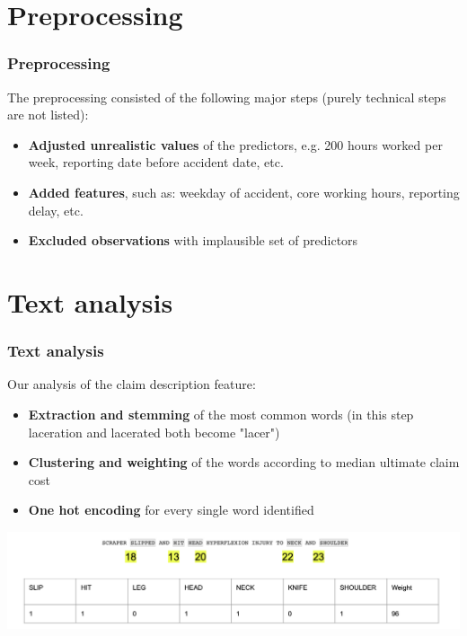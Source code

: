 \documentclass{beamer}
\begin{document}

\section{Preprocessing}
\begin{frame}
\frametitle{Preprocessing}
The preprocessing consisted of the following major steps (purely technical steps are not listed):
\begin{itemize}
\item \textbf{Adjusted unrealistic values} of the predictors, e.g. 200 hours worked per week, reporting date before accident date, etc.
\item \textbf{Added features}, such as: weekday of accident, core working hours, reporting delay, etc.
\item \textbf{Excluded observations} with implausible set of predictors
\end{itemize}
\end{frame}


\section{Text analysis}
\begin{frame}
\frametitle{Text analysis}
Our analysis of the claim description feature:
\begin{itemize}
\item \textbf{Extraction and stemming} of the most common words (in this step laceration and lacerated both become "lacer")
\item \textbf{Clustering and weighting} of the words according to median ultimate claim cost
\item \textbf{One hot encoding} for every single word identified
\end{itemize}


\includegraphics[width=\textwidth]{./images/claimdescription.png}
\end{frame}
\end{document}
